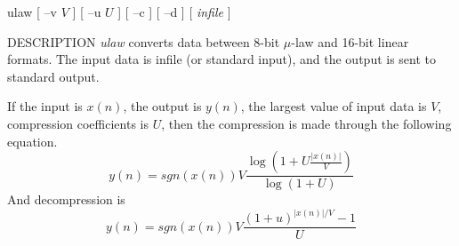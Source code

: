 % 
% 
% 
% 
%                                                                        
%
\hypertarget{ulaw}{}

\begin{synopsis}
\item[ulaw] [ --v $V$ ] [ --u $U$ ] [ --c ] [ --d ] [ {\em infile} ]
\end{synopsis}

\begin{qsection}{DESCRIPTION}
{\em ulaw} converts data between 8-bit $\mu$-law and 16-bit linear formats.
The input data is {\rm infile} (or standard input), 
and the output is sent to standard output.

If the input is $x(n)$, the output is $y(n)$,
the largest value of input data is $V$, compression coefficients is $U$,
then the compression is made through the following equation.
\begin{displaymath}
y(n) = sgn(x(n)) V \frac{\log(1 + U \frac{|x(n)|}{V} )}{\log(1+U)}
\end{displaymath}
And decompression is
\begin{displaymath}
y(n) = sgn(x(n)) V \frac{(1+u)^{|x(n)|/V} - 1}{U}
\end{displaymath}
\end{qsection}

